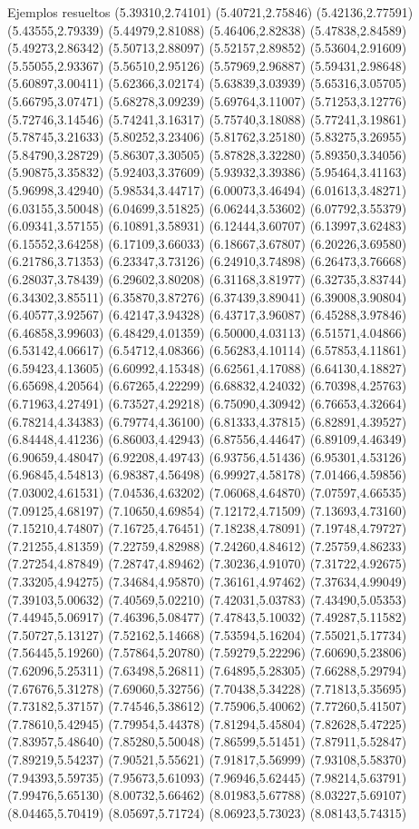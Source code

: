 \documentclass[11pt,a4paper]{article}
\begin{document}
\begin{fmex}{Ejemplos resueltos}
(5.39310,2.74101) (5.40721,2.75846) (5.42136,2.77591) (5.43555,2.79339) (5.44979,2.81088) (5.46406,2.82838) (5.47838,2.84589) (5.49273,2.86342) (5.50713,2.88097) (5.52157,2.89852) (5.53604,2.91609) (5.55055,2.93367) (5.56510,2.95126) (5.57969,2.96887) (5.59431,2.98648) (5.60897,3.00411) (5.62366,3.02174) (5.63839,3.03939) (5.65316,3.05705) (5.66795,3.07471) (5.68278,3.09239) (5.69764,3.11007) (5.71253,3.12776) (5.72746,3.14546) (5.74241,3.16317) (5.75740,3.18088) (5.77241,3.19861) (5.78745,3.21633) (5.80252,3.23406) (5.81762,3.25180) (5.83275,3.26955) (5.84790,3.28729) (5.86307,3.30505) (5.87828,3.32280) (5.89350,3.34056) (5.90875,3.35832) (5.92403,3.37609) (5.93932,3.39386) (5.95464,3.41163) (5.96998,3.42940) (5.98534,3.44717) (6.00073,3.46494) (6.01613,3.48271) (6.03155,3.50048) (6.04699,3.51825) (6.06244,3.53602) (6.07792,3.55379) (6.09341,3.57155) (6.10891,3.58931) (6.12444,3.60707) (6.13997,3.62483) (6.15552,3.64258) (6.17109,3.66033) (6.18667,3.67807) (6.20226,3.69580) (6.21786,3.71353) (6.23347,3.73126) (6.24910,3.74898) (6.26473,3.76668) (6.28037,3.78439) (6.29602,3.80208) (6.31168,3.81977) (6.32735,3.83744) (6.34302,3.85511) (6.35870,3.87276) (6.37439,3.89041) (6.39008,3.90804) (6.40577,3.92567) (6.42147,3.94328) (6.43717,3.96087) (6.45288,3.97846) (6.46858,3.99603) (6.48429,4.01359) (6.50000,4.03113) (6.51571,4.04866) (6.53142,4.06617) (6.54712,4.08366) (6.56283,4.10114) (6.57853,4.11861) (6.59423,4.13605) (6.60992,4.15348) (6.62561,4.17088) (6.64130,4.18827) (6.65698,4.20564) (6.67265,4.22299) (6.68832,4.24032) (6.70398,4.25763) (6.71963,4.27491) (6.73527,4.29218) (6.75090,4.30942) (6.76653,4.32664) (6.78214,4.34383) (6.79774,4.36100) (6.81333,4.37815) (6.82891,4.39527) (6.84448,4.41236) (6.86003,4.42943) (6.87556,4.44647) (6.89109,4.46349) (6.90659,4.48047) (6.92208,4.49743) (6.93756,4.51436) (6.95301,4.53126) (6.96845,4.54813) (6.98387,4.56498) (6.99927,4.58178) (7.01466,4.59856) (7.03002,4.61531) (7.04536,4.63202) (7.06068,4.64870) (7.07597,4.66535) (7.09125,4.68197) (7.10650,4.69854) (7.12172,4.71509) (7.13693,4.73160) (7.15210,4.74807) (7.16725,4.76451) (7.18238,4.78091) (7.19748,4.79727) (7.21255,4.81359) (7.22759,4.82988) (7.24260,4.84612) (7.25759,4.86233) (7.27254,4.87849) (7.28747,4.89462) (7.30236,4.91070) (7.31722,4.92675) (7.33205,4.94275) (7.34684,4.95870) (7.36161,4.97462) (7.37634,4.99049) (7.39103,5.00632) (7.40569,5.02210) (7.42031,5.03783) (7.43490,5.05353) (7.44945,5.06917) (7.46396,5.08477) (7.47843,5.10032) (7.49287,5.11582) (7.50727,5.13127) (7.52162,5.14668) (7.53594,5.16204) (7.55021,5.17734) (7.56445,5.19260) (7.57864,5.20780) (7.59279,5.22296) (7.60690,5.23806) (7.62096,5.25311) (7.63498,5.26811) (7.64895,5.28305) (7.66288,5.29794) (7.67676,5.31278) (7.69060,5.32756) (7.70438,5.34228) (7.71813,5.35695) (7.73182,5.37157) (7.74546,5.38612) (7.75906,5.40062) (7.77260,5.41507) (7.78610,5.42945) (7.79954,5.44378) (7.81294,5.45804) (7.82628,5.47225) (7.83957,5.48640) (7.85280,5.50048) (7.86599,5.51451) (7.87911,5.52847) (7.89219,5.54237) (7.90521,5.55621) (7.91817,5.56999) (7.93108,5.58370) (7.94393,5.59735) (7.95673,5.61093) (7.96946,5.62445) (7.98214,5.63791) (7.99476,5.65130) (8.00732,5.66462) (8.01983,5.67788) (8.03227,5.69107) (8.04465,5.70419) (8.05697,5.71724) (8.06923,5.73023) (8.08143,5.74315) 
\end{fmex}
\end{document}
